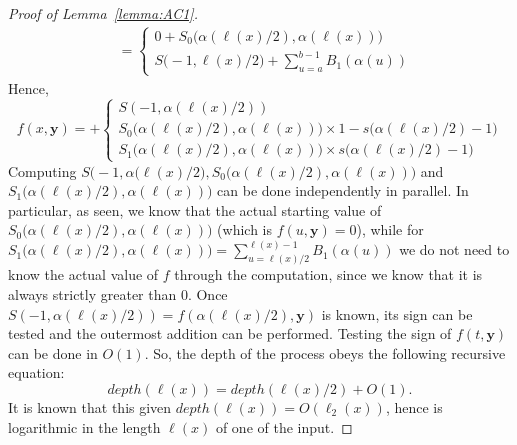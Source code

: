 \documentclass[11pt, oneside]{article}
\newenvironment{toappendix}{}{}
\newcommand{\tu}[1]{\mathbf{#1}}
\theoremstyle{definition}
\begin{document}
\begin{toappendix}
\begin{proof}[Proof of Lemma~\ref{lemma:AC1}]
\begin{align*}
        &= \begin{cases}
            0 + S_0\big(\alpha(\ell(x)/2), \alpha(\ell(x))\big) \\
            S\big(-1, \ell(x)/2\big) + \sum^{b-1}_{u=a} B_1(\alpha(u))
        \end{cases}
    \end{align*}
    Hence,
    $$
        f(x, \tu y) = + \begin{cases}
            S(-1, \alpha(\ell(x)/2)) \\
            S_0\big(\alpha(\ell(x)/2), \alpha(\ell(x))\big) \times 1- s\big(\alpha(\ell(x)/2)-1\big) \\
            S_1\big(\alpha(\ell(x)/2), \alpha(\ell(x))\big) \times s\big(\alpha(\ell(x)/2)-1\big)
        \end{cases}
    $$
    Computing $S\big(-1, \alpha(\ell(x)/2\big), S_0\big(\alpha(\ell(x)/2), \alpha(\ell(x))\big)$ and $S_1\big(\alpha(\ell(x)/2), \alpha(\ell(x))\big)$ can be done independently in parallel.
    In particular, as seen, we know that the actual starting value of $S_0\big(\alpha(\ell(x)/2), \alpha(\ell(x))\big)$ (which is $f(u, \tu y)=0$), while for $S_1\big(\alpha(\ell(x)/2), \alpha(\ell(x))\big)=\sum^{\ell(x)-1}_{u=\ell(x)/2}B_1(\alpha(u))$ we do not need to know the actual value of $f$ through the computation, since we know that it is always strictly greater than 0.
    Once $S(-1, \alpha(\ell(x)/2))=f(\alpha(\ell(x)/2), \tu y)$ is known, its sign can be tested and the outermost addition can be performed. 
    Testing the sign of $f(t, \tu y)$ can be done in $O(1)$.
    So, the depth of the process obeys the following recursive equation:
    $$
    depth(\ell(x)) = depth(\ell(x)/2) + O(1).
    $$
    It is known that this given $depth(\ell(x))=O(\ell_2(x))$, hence is logarithmic in the length $\ell(x)$ of one of the input.
\end{proof}
    
\end{toappendix}
\end{document}
